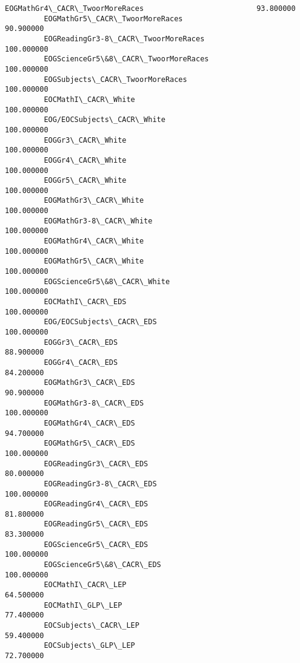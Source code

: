 \documentclass[11pt]{article}
\begin{document}
\begin{Verbatim}[commandchars=\\\{\}]
         EOGMathGr4\_CACR\_TwoorMoreRaces                          93.800000  
         EOGMathGr5\_CACR\_TwoorMoreRaces                          90.900000  
         EOGReadingGr3-8\_CACR\_TwoorMoreRaces                    100.000000  
         EOGScienceGr5\&8\_CACR\_TwoorMoreRaces                    100.000000  
         EOGSubjects\_CACR\_TwoorMoreRaces                        100.000000  
         EOCMathI\_CACR\_White                                    100.000000  
         EOG/EOCSubjects\_CACR\_White                             100.000000  
         EOGGr3\_CACR\_White                                      100.000000  
         EOGGr4\_CACR\_White                                      100.000000  
         EOGGr5\_CACR\_White                                      100.000000  
         EOGMathGr3\_CACR\_White                                  100.000000  
         EOGMathGr3-8\_CACR\_White                                100.000000  
         EOGMathGr4\_CACR\_White                                  100.000000  
         EOGMathGr5\_CACR\_White                                  100.000000  
         EOGScienceGr5\&8\_CACR\_White                             100.000000  
         EOCMathI\_CACR\_EDS                                      100.000000  
         EOG/EOCSubjects\_CACR\_EDS                               100.000000  
         EOGGr3\_CACR\_EDS                                         88.900000  
         EOGGr4\_CACR\_EDS                                         84.200000  
         EOGMathGr3\_CACR\_EDS                                     90.900000  
         EOGMathGr3-8\_CACR\_EDS                                  100.000000  
         EOGMathGr4\_CACR\_EDS                                     94.700000  
         EOGMathGr5\_CACR\_EDS                                    100.000000  
         EOGReadingGr3\_CACR\_EDS                                  80.000000  
         EOGReadingGr3-8\_CACR\_EDS                               100.000000  
         EOGReadingGr4\_CACR\_EDS                                  81.800000  
         EOGReadingGr5\_CACR\_EDS                                  83.300000  
         EOGScienceGr5\_CACR\_EDS                                 100.000000  
         EOGScienceGr5\&8\_CACR\_EDS                               100.000000  
         EOCMathI\_CACR\_LEP                                       64.500000  
         EOCMathI\_GLP\_LEP                                        77.400000  
         EOCSubjects\_CACR\_LEP                                    59.400000  
         EOCSubjects\_GLP\_LEP                                     72.700000  

\end{Verbatim}
\end{document}
